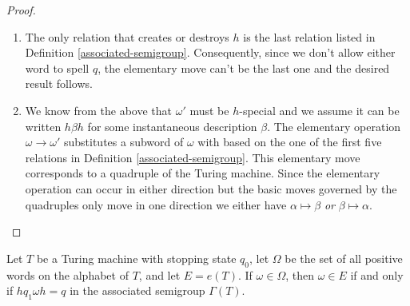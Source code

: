 \begin{proof}
  \begin{enumerate}
  \item The only relation that creates or destroys $h$ is the last relation listed in Definition \ref{associated-semigroup}. Consequently, since we don't allow either word to spell $q$, the elementary move can't be the last one and the desired result follows.
  \item We know from the above that $\omega'$ must be $h$-special and we assume it can be written $h\beta h$ for some instantaneous description $\beta$. The elementary operation $\omega \rightarrow \omega'$ substitutes a subword of $\omega$ with based on the one of the first five relations in Definition \ref{associated-semigroup}. This elementary move corresponds to a quadruple of the Turing machine. Since the elementary operation can occur in either direction but the basic moves governed by the quadruples only move in one direction we either have $\alpha \mapsto \beta$ \emph{or} $\beta \mapsto \alpha$.
  \end{enumerate}
\end{proof}

\begin{lemma}
  \label{lem:semi-turing}
  Let $T$ be a Turing machine with stopping state $q_0$, let $\Omega$ be the set of all positive words on the alphabet of $T$, and let $E = e(T)$. If $\omega \in \Omega$, then $\omega \in E$ if and only if $hq_1\omega h = q$ in the associated semigroup $\Gamma(T)$.
\end{lemma}

